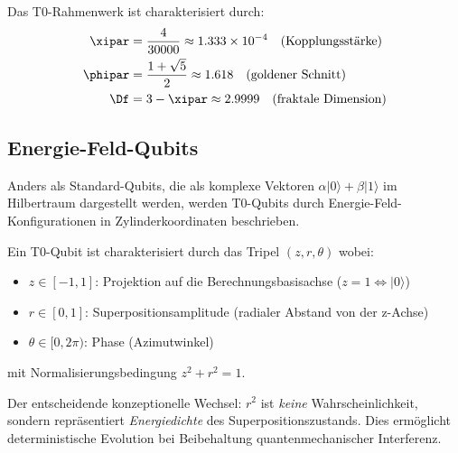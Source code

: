 \begin{definition}
	Das T0-Rahmenwerk ist charakterisiert durch:
	\begin{align}
		\xipar &= \frac{4}{30000} \approx 1.333 \times 10^{-4} \quad \text{(Kopplungsstärke)} \\
		\phipar &= \frac{1 + \sqrt{5}}{2} \approx 1.618 \quad \text{(goldener Schnitt)} \\
		\Df &= 3 - \xipar \approx 2.9999 \quad \text{(fraktale Dimension)}
	\end{align}
\end{definition}

\subsection{Energie-Feld-Qubits}

Anders als Standard-Qubits, die als komplexe Vektoren $\alpha|0\rangle + \beta|1\rangle$ im Hilbertraum dargestellt werden, werden T0-Qubits durch Energie-Feld-Konfigurationen in Zylinderkoordinaten beschrieben.

\begin{definition}[T0 Qubit]
	Ein T0-Qubit ist charakterisiert durch das Tripel $(z, r, \theta)$ wobei:
	\begin{itemize}
		\item $z \in [-1, 1]$: Projektion auf die Berechnungsbasisachse ($z=1 \Leftrightarrow |0\rangle$)
		\item $r \in [0, 1]$: Superpositionsamplitude (radialer Abstand von der z-Achse)
		\item $\theta \in [0, 2\pi)$: Phase (Azimutwinkel)
	\end{itemize}
	mit Normalisierungsbedingung $z^2 + r^2 = 1$.
\end{definition}

\begin{remark}
	Der entscheidende konzeptionelle Wechsel: $r^2$ ist \emph{keine} Wahrscheinlichkeit, sondern repräsentiert \emph{Energiedichte} des Superpositionszustands. Dies ermöglicht deterministische Evolution bei Beibehaltung quantenmechanischer Interferenz.
\end{remark}

